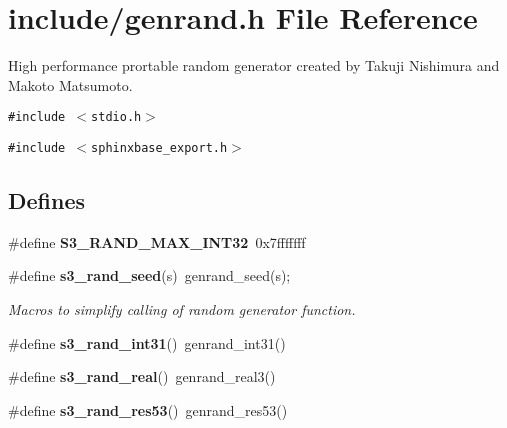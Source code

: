 \section{include/genrand.h File Reference}
\label{genrand_8h}
High performance prortable random generator created by Takuji Nishimura and Makoto Matsumoto.  


{\tt \#include $<$stdio.h$>$}\par
{\tt \#include $<$sphinxbase\_\-export.h$>$}\par
\subsection*{Defines}
\begin{CompactItemize}
\item 
\#define \textbf{S3\_\-RAND\_\-MAX\_\-INT32}~0x7fffffff\label{genrand_8h_29d6253e4a57e7c4d56cf7f6155b4007}

\item 
\#define {\bf s3\_\-rand\_\-seed}(s)~genrand\_\-seed(s);\label{genrand_8h_88ed88daecb88e115d8559c1b0a09bb7}

\begin{CompactList}\small\item\em Macros to simplify calling of random generator function. \item\end{CompactList}\item 
\#define \textbf{s3\_\-rand\_\-int31}()~genrand\_\-int31()\label{genrand_8h_3dcc058023a95c0a0ca1f12d1fdec9b9}

\item 
\#define \textbf{s3\_\-rand\_\-real}()~genrand\_\-real3()\label{genrand_8h_85a5844eace98dcbb4742d408a75d5e7}

\item 
\#define \textbf{s3\_\-rand\_\-res53}()~genrand\_\-res53()\label{genrand_8h_226b9a1deec002aeb1f1775b830a3062}

\end{CompactItemize}
